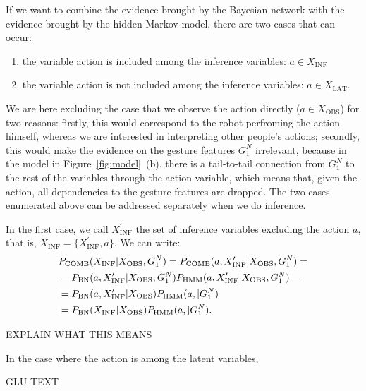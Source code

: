 If we want to combine the evidence brought by the Bayesian network with the evidence brought by the hidden Markov model, there are two cases that can occur:
\begin{enumerate}
\item the variable action is included among the inference variables: $a \in X_\text{INF}$
\item the variable action is not included among the inference variables: $a \in X_\text{LAT}$.
\end{enumerate}
We are here excluding the case that we observe the action directly ($a\in X_\text{OBS}$) for two reasons: firstly, this would correspond to the robot perfroming the action himself, whereas we are interested in interpreting other people's actions;
secondly, this would make the evidence on the gesture features $G_1^N$ irrelevant, because in the model in Figure~\ref{fig:model}~(b), there is a tail-to-tail connection from $G_1^N$ to the rest of the variables through the action variable, which means that, given the action, all dependencies to the gesture features are dropped. 
The two cases enumerated above can be addressed separately when we do inference.

In the first case, we call $X_\text{INF}^\prime$ the set of inference variables excluding the action $a$, that is, $X_\text{INF} = \{X_\text{INF}^\prime, a\}$.
We can write:
\begin{align*}
  & P_{\text{COMB}}(X_\text{INF}| X_\text{OBS}, G_1^N) = P_{\text{COMB}}(a, X_\text{INF}^\prime| X_\text{OBS}, G_1^N)= \\
  &= P_{\text{BN}}(a, X_\text{INF}^\prime| X_\text{OBS}, G_1^N) P_{\text{HMM}}(a, X_\text{INF}^\prime| X_\text{OBS}, G_1^N)= \\
  &= P_{\text{BN}}(a, X_\text{INF}^\prime| X_\text{OBS}) P_{\text{HMM}}(a, | G_1^N) \\
  &= P_{\text{BN}}(X_\text{INF}| X_\text{OBS}) P_{\text{HMM}}(a, | G_1^N).
\end{align*}

EXPLAIN WHAT THIS MEANS

In the case where the action is among the latent variables, 

GLU TEXT

